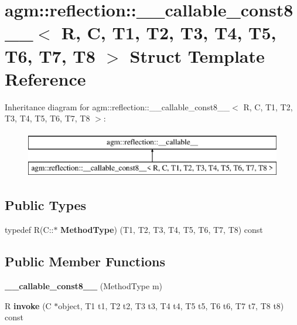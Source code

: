 \hypertarget{structagm_1_1reflection_1_1____callable__const8____}{}\section{agm\+:\+:reflection\+:\+:\+\_\+\+\_\+callable\+\_\+const8\+\_\+\+\_\+$<$ R, C, T1, T2, T3, T4, T5, T6, T7, T8 $>$ Struct Template Reference}
\label{structagm_1_1reflection_1_1____callable__const8____}
Inheritance diagram for agm\+:\+:reflection\+:\+:\+\_\+\+\_\+callable\+\_\+const8\+\_\+\+\_\+$<$ R, C, T1, T2, T3, T4, T5, T6, T7, T8 $>$\+:\begin{figure}[H]
\begin{center}
\leavevmode
\includegraphics[height=2.000000cm]{structagm_1_1reflection_1_1____callable__const8____}
\end{center}
\end{figure}
\subsection*{Public Types}
\begin{DoxyCompactItemize}
\item 
typedef R(C\+::$\ast$ {\bfseries Method\+Type}) (T1, T2, T3, T4, T5, T6, T7, T8) const \hypertarget{structagm_1_1reflection_1_1____callable__const8_____ad5b537f4d94df190a9fa7ff9d1f72d4c}{}\label{structagm_1_1reflection_1_1____callable__const8_____ad5b537f4d94df190a9fa7ff9d1f72d4c}

\end{DoxyCompactItemize}
\subsection*{Public Member Functions}
\begin{DoxyCompactItemize}
\item 
{\bfseries \+\_\+\+\_\+callable\+\_\+const8\+\_\+\+\_\+} (Method\+Type m)\hypertarget{structagm_1_1reflection_1_1____callable__const8_____a8f040a4401cba84fb9d97f46ad783482}{}\label{structagm_1_1reflection_1_1____callable__const8_____a8f040a4401cba84fb9d97f46ad783482}

\item 
R {\bfseries invoke} (C $\ast$object, T1 t1, T2 t2, T3 t3, T4 t4, T5 t5, T6 t6, T7 t7, T8 t8) const \hypertarget{structagm_1_1reflection_1_1____callable__const8_____a40f52e50509201574fc7e9e29576c218}{}\label{structagm_1_1reflection_1_1____callable__const8_____a40f52e50509201574fc7e9e29576c218}

\end{DoxyCompactItemize}
